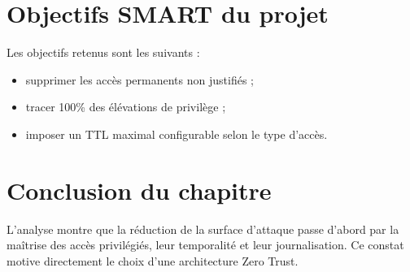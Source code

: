 \section{Objectifs SMART du projet}
Les objectifs retenus sont les suivants :
\begin{itemize}
  \item supprimer les accès permanents non justifiés ;
  \item tracer 100\% des élévations de privilège ;
  \item imposer un TTL maximal configurable selon le type d'accès.
\end{itemize}

\section{Conclusion du chapitre}
L'analyse montre que la réduction de la surface d'attaque passe d'abord par la maîtrise des accès privilégiés, leur temporalité et leur journalisation. Ce constat motive directement le choix d'une architecture Zero Trust.